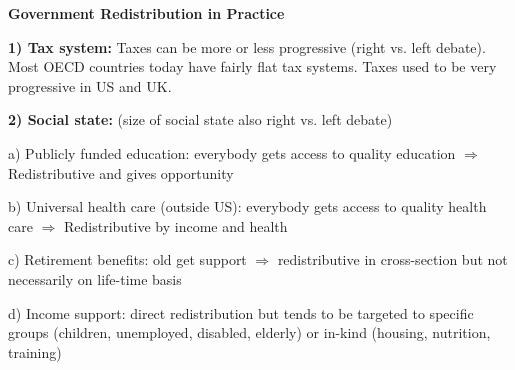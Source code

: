 \documentclass[landscape]{slides}
\begin{document}
\begin{slide}
\begin{center}
{\bf Government Redistribution in Practice}
\end{center}
\textbf{1) Tax system:} Taxes can be more or less progressive (right vs. left debate).
Most OECD countries today have fairly
flat tax systems. Taxes used to be very progressive in US and UK.

\textbf{2) Social state:} (size of social state also right vs. left debate)

a) Publicly funded education: everybody gets access
to quality education $\Rightarrow$ Redistributive and gives opportunity

b) Universal health care (outside US): everybody gets access
to quality health care $\Rightarrow$ Redistributive by income and health 

c) Retirement benefits: old get support $\Rightarrow$ redistributive in cross-section but not necessarily
on life-time basis

d) Income support: direct redistribution but tends to be targeted to specific groups (children, unemployed, disabled, elderly)
or in-kind (housing, nutrition, training) 


\end{slide}


%
%
%
%
\end{document}
